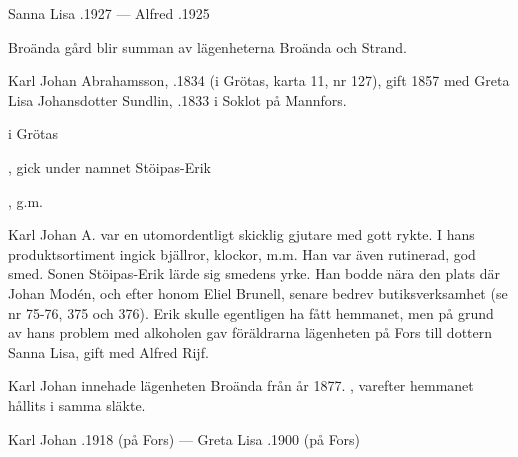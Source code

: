 Sanna Lisa .1927  ---  Alfred .1925



%

Broända gård blir summan av lägenheterna Broända och Strand.

%
Karl Johan Abrahamsson, .1834 (i Grötas, karta 11, nr 127), gift 1857 med Greta Lisa Johansdotter Sundlin, .1833 i Soklot på Mannfors.
\begin{jhchildren}
  \item {} i Grötas
  \item {}
  \item {}, gick under namnet Stöipas-Erik
  \item {}
  \item {}
  \item {}, g.m. 
\end{jhchildren}

Karl Johan A. var en utomordentligt skicklig gjutare med gott rykte. I hans produktsortiment ingick bjällror, klockor, m.m. Han var även rutinerad, god smed. Sonen Stöipas-Erik lärde sig smedens yrke. Han bodde nära den plats där Johan Modén, och efter honom Eliel Brunell, senare bedrev butiksverksamhet (se nr 75-76, 375 och 376). Erik skulle egentligen ha fått hemmanet, men på grund av hans problem med alkoholen gav föräldrarna lägenheten på Fors till dottern Sanna Lisa, gift med Alfred Rijf.

Karl Johan innehade lägenheten Broända från år 1877. , varefter hemmanet hållits i samma släkte.

Karl Johan .1918 (på Fors)  ---  Greta Lisa .1900 (på Fors)



